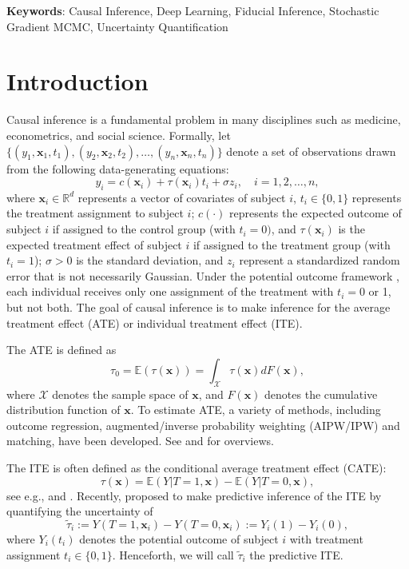 \documentclass[11pt]{article}
\newcommand{\bx}{{\boldsymbol x}}
\newcommand{\mX}{\mathcal{X}}
\begin{document}
\noindent
{\bf Keywords}: Causal Inference, Deep Learning, Fiducial Inference, Stochastic Gradient MCMC, Uncertainty Quantification
  
  
\section{Introduction}



Causal inference is a fundamental problem in many disciplines such as medicine, econometrics, and social science. Formally, let $\{(y_1,\bx_1,t_1), (y_2,\bx_2,t_2),\ldots, (y_n,\bx_n,t_n)\}$ denote a set of observations drawn from the following data-generating equations: 
\begin{equation} \label{dataGeq}
y_i=c(\bx_i) +\tau(\bx_i) t_i+\sigma z_i,  \quad i=1,2,\ldots,n,
\end{equation} 
where $\bx_i \in \mathbb{R}^d$ represents a vector of covariates of subject $i$, 
$t_i \in \{0,1\}$ represents the treatment assignment to subject $i$; 
$c(\cdot)$ represents the expected outcome of 
subject $i$ if assigned to the control group (with $t_i=0)$, and $\tau(\bx_i)$ is the 
expected treatment effect of subject $i$ if assigned to the treatment group (with $t_i=1$); $\sigma>0$ is the standard deviation,  and $z_i$ represent a standardized  random error that is not necessarily Gaussian. Under the potential outcome framework \citep{Rubin1974EstimatingCE}, each individual  
receives only one assignment of the treatment with $t_i=0$ or 1, but not both. 
The goal of causal inference is to make inference for the average treatment effect (ATE) or individual treatment effect (ITE). 

The ATE is defined as 
\begin{equation}\label{ATEeq}
\tau_0=\mathbb{E}(\tau(\bx))=\int_{\mX} \tau(\bx) dF(\bx),
\end{equation}
where $\mX$ denotes the sample space of $\bx$, and 
$F(\bx)$ denotes the cumulative distribution function of $\bx$.
 To estimate ATE, a variety of methods, including outcome regression, augmented/inverse probability weighting (AIPW/IPW) and matching, have been developed. See \cite{Imbens2004NonparametricEO} and \cite{Rosenbaum2002Book} for overviews. 
 
The ITE is often defined as the conditional average treatment effect (CATE):   
\begin{equation} \label{CATEeq}
\tau(\bx)=\mathbb{E}(Y|T=1,\bx)-\mathbb{E}(Y|T=0,\bx),
\end{equation}
see e.g., \cite{shalit2017pehe} and \cite{Lu2018EstimatingIT}. 
Recently, \cite{lei2021ite} proposed to make 
predictive inference of the ITE by quantifying the uncertainty of 
\begin{equation} \label{ITEeq}
\tilde{\tau}_i:=Y(T=1,\bx_i)-Y(T=0,\bx_i):=Y_i(1)-Y_i(0),
\end{equation}
where $Y_i(t_i)$ denotes the potential outcome of subject  
$i$ with treatment assignment $t_i \in \{0,1\}$. Henceforth, we will call $\tilde{\tau}_i$ the predictive ITE.  
\end{document}

